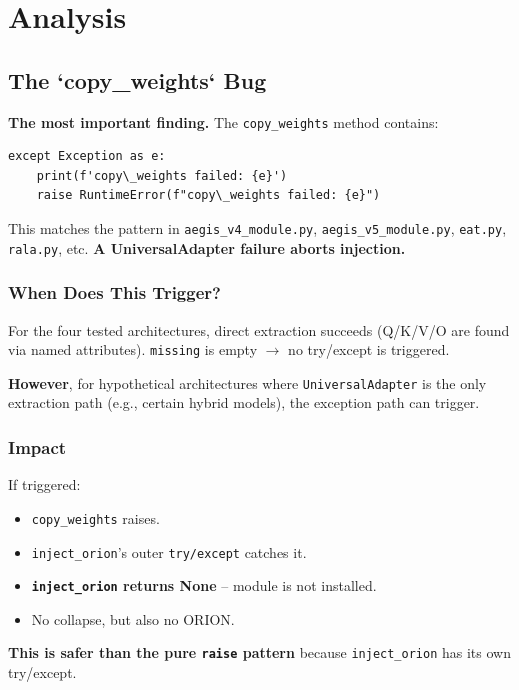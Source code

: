 
\section{Analysis}

\subsection{The `copy\_weights` Bug}

\textbf{The most important finding.} The \texttt{copy\_weights} method contains:

\begin{lstlisting}
except Exception as e:
    print(f'copy\_weights failed: {e}')
    raise RuntimeError(f"copy\_weights failed: {e}")
\end{lstlisting}

This matches the pattern in \texttt{aegis\_v4\_module.py}, \texttt{aegis\_v5\_module.py}, 
\texttt{eat.py}, \texttt{rala.py}, etc. \textbf{A UniversalAdapter failure aborts injection.}

\subsubsection{When Does This Trigger?}

For the four tested architectures, direct extraction succeeds (Q/K/V/O 
are found via named attributes). \texttt{missing} is empty $\to$ no try/except is 
triggered.

\textbf{However}, for hypothetical architectures where \texttt{UniversalAdapter} is 
the only extraction path (e.g., certain hybrid models), the exception 
path can trigger.

\subsubsection{Impact}

If triggered:
\begin{itemize}
\item \texttt{copy\_weights} raises.
\item \texttt{inject\_orion}'s outer \texttt{try/except} catches it.
\item \textbf{\texttt{inject\_orion} returns None} -- module is not installed.
\item No collapse, but also no ORION.

\end{itemize}
\textbf{This is safer than the pure \texttt{raise} pattern} because \texttt{inject\_orion} 
has its own try/except.

